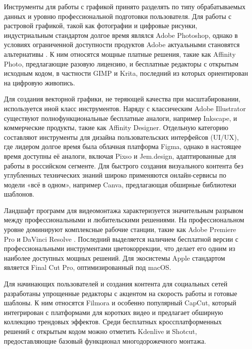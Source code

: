 \documentclass{SibFU-docs}
\begin{document}

Инструменты для работы с графикой принято разделять по типу обрабатываемых данных и уровню профессиональной подготовки пользователя. Для работы с растровой графикой, такой как фотографии и цифровые рисунки, индустриальным стандартом долгое время являлся Adobe Photoshop, однако в условиях ограниченной доступности продуктов Adobe актуальными становятся альтернативы \cite{lifehacker}. К ним относятся мощные платные решения, такие как Affinity Photo, предлагающие разовую лицензию, и бесплатные редакторы с открытым исходным кодом, в частности GIMP и Krita, последний из которых ориентирован на цифровую живопись.

Для создания векторной графики, не теряющей качества при масштабировании, используется иной класс инструментов. Наряду с классическим Adobe Illustrator существуют полнофункциональные бесплатные аналоги, например Inkscape, и коммерческие продукты, такие как Affinity Designer. Отдельную категорию составляют инструменты для дизайна пользовательских интерфейсов (UI/UX), где лидером долгое время была облачная платформа Figma, однако в настоящее время доступны её аналоги, включая Pixso и Jem.design, адаптированные для работы в российском сегменте. Для быстрого создания визуального контента без углубленных технических знаний широко применяются онлайн-сервисы по модели «всё в одном», например Canva, предлагающая обширные библиотеки шаблонов.


Ландшафт программ для видеомонтажа характеризуется значительным разрывом между профессиональными и любительскими решениями. На профессиональном уровне доминируют комплексные рабочие станции, такие как Adobe Premiere Pro и DaVinci Resolve \cite{skypro}. Последний выделяется наличием бесплатной версии с профессиональными инструментами цветокоррекции, что делает его одним из наиболее доступных мощных решений. Для экосистемы Apple стандартом является Final Cut Pro, оптимизированный под macOS.

Для начинающих пользователей и создания контента для социальных сетей разработаны упрощенные редакторы с акцентом на скорость работы и готовые шаблоны. К ним относятся Filmora и особенно популярный CapCut, который интегрирован с платформами для коротких видео и предлагает обширную коллекцию трендовых эффектов. Среди бесплатных кроссплатформенных решений с открытым кодом можно отметить Kdenlive и Shotcut, предоставляющие базовый функционал многодорожечного монтажа.
\end{document}
